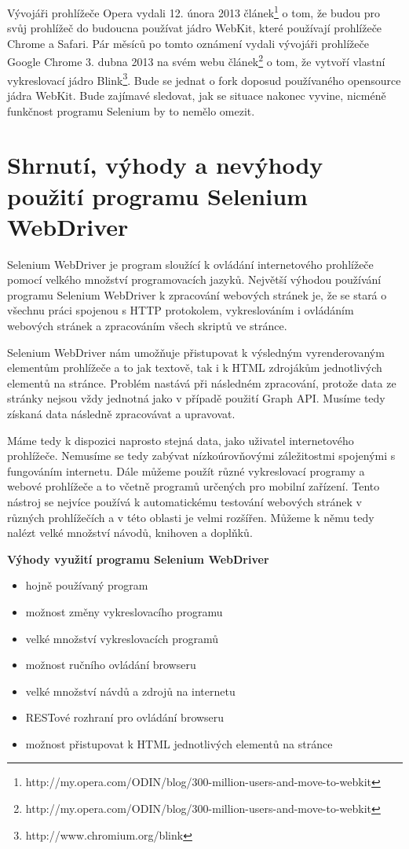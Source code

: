 \documentclass[thesis=M,czech]{FITthesis}[2013/05/10]
\begin{document}
Vývojáři prohlížeče Opera vydali 12. února 2013 
článek\footnote{http://my.opera.com/ODIN/blog/300-million-users-and-move-to-webkit}
o tom, že budou pro svůj prohlížeč do budoucna používat jádro 
WebKit, které používají prohlížeče Chrome a Safari.
Pár měsíců po tomto oznámení vydali vývojáři prohlížeče Google Chrome 
3. dubna 2013 na svém webu 
článek\footnote{http://my.opera.com/ODIN/blog/300-million-users-and-move-to-webkit} o tom, že vytvoří vlastní vykreslovací jádro 
Blink\footnote{http://www.chromium.org/blink}. 
Bude se jednat o fork doposud používaného opensource jádra WebKit.
Bude zajímavé sledovat, jak se situace nakonec vyvine, nicméně 
funkčnost programu Selenium by to nemělo omezit.

\section{Shrnutí, výhody a nevýhody použití programu Selenium WebDriver}

Selenium WebDriver je program sloužící k ovládání internetového 
prohlížeče pomocí velkého množství programovacích jazyků. 
Největší výhodou používání programu Selenium WebDriver k zpracování 
webových stránek je, že se stará o všechnu práci spojenou s HTTP 
protokolem, vykreslováním i ovládáním webových stránek a zpracováním 
všech skriptů ve stránce. 

Selenium WebDriver nám umožňuje přistupovat k výsledným 
vyrenderovaným elementům prohlížeče a to jak textově, tak i k HTML zdrojákům jednotlivých elementů na stránce. Problém nastává při následném zpracování, protože data ze stránky nejsou vždy jednotná jako v případě použití Graph API. Musíme tedy získaná data následně zpracovávat a upravovat.

Máme tedy k dispozici naprosto 
stejná data, jako uživatel internetového prohlížeče. Nemusíme se tedy 
zabývat nízkoúrovňovými záležitostmi spojenými s fungováním internetu. 
Dále můžeme použít různé vykreslovací programy a webové prohlížeče
a to včetně programů určených pro mobilní zařízení.
Tento nástroj se nejvíce používá k automatickému testování webových 
stránek v různých prohlížečích a v této oblasti je velmi rozšířen. 
Můžeme k němu tedy nalézt velké množství návodů, knihoven a doplňků. 

\textbf{Výhody využití programu Selenium WebDriver}

\begin{itemize}
  \item hojně používaný program
  \item možnost změny vykreslovacího programu
  \item velké množství vykreslovacích programů
  \item možnost ručního ovládání browseru
  \item velké množství návdů a zdrojů na internetu
  \item RESTové rozhraní pro ovládání browseru
  \item možnost přistupovat k HTML jednotlivých elementů na stránce
\end{itemize}
\end{document}
